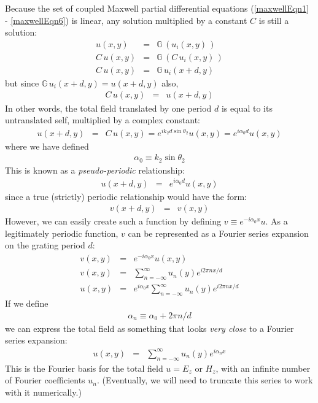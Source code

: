 Because the set of coupled Maxwell partial differential equations (\ref{maxwellEqn1} - \ref{maxwellEqn6}) is linear, any solution multiplied by a constant $C$ is still a solution:
\begin{eqnarray}
u(x,y) &=& \mathbb{G} \, ( u_i(x,y) \, ) \\
C \, u(x,y) &=& \mathbb{G} \, ( C \, u_i(x,y) \, ) \\
C \, u(x, y) &=& \mathbb{G} \, u_i(x+d,y)
\end{eqnarray}
but since $\mathbb{G} \, u_i(x+d,y) = u(x+d, y)$ also,
\begin{eqnarray}
C \, u(x, y) &=& u(x+d, y)
\end{eqnarray}
In other words, the total field translated by one period $d$ is equal to its untranslated self, multiplied by a complex constant:
\begin{eqnarray}
u(x+d, y) &=& C \, u(x, y) = e^{i k_2 d \sin \theta_2} u(x,y) = e^{i \alpha_0 d} u(x,y)
\end{eqnarray}
where we have defined 
\begin{eqnarray}
\boxed{\alpha_0 \equiv k_2 \sin \theta_2}
\end{eqnarray}
This is known as a \emph{pseudo-periodic} relationship:
\begin{eqnarray}
u(x+d, y) &=& e^{i \alpha_0 d} u(x,y)
\end{eqnarray}
since a true (strictly) periodic relationship would have the form:
\begin{eqnarray}
v(x+d, y) &=& v(x,y)
\end{eqnarray}
However, we can easily create such a function by defining $v \equiv e^{-i \alpha_0 x} u$.  As a legitimately periodic function, $v$ can be represented as a Fourier series expansion on the grating period $d$:
\begin{eqnarray}
v(x, y) &=& e^{-i \alpha_0 x} u(x,y) \\
v(x,y) &=& \sum_{n=-\infty}^{\infty} u_n(y) e^{i2\pi n x/d} \\
u(x,y) &=& e^{i \alpha_0 x} \sum_{n=-\infty}^{\infty} u_n(y) e^{i2\pi n x/d}
\end{eqnarray}
If we define 
\begin{eqnarray}
\boxed{\alpha_n \equiv \alpha_0 + 2 \pi n / d}
\end{eqnarray}
we can express the total field as something that looks \emph{very close} to a Fourier series expansion:
\begin{eqnarray}
u(x,y) &=&  \sum_{n=-\infty}^{\infty} u_n(y) e^{i\alpha_nx}
\end{eqnarray}
This is the Fourier basis for the total field $u = E_z$ or $H_z$, with an infinite number of Fourier coefficients $u_n$.  (Eventually, we will need to truncate this series to work with it numerically.)
